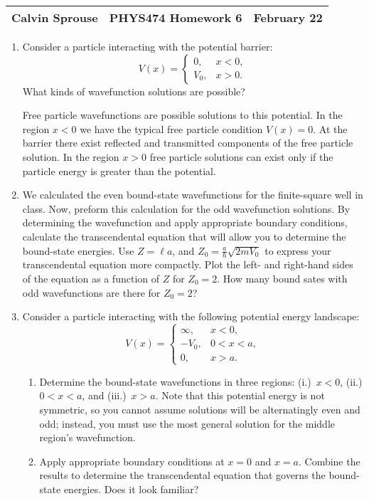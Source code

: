\documentclass[a4paper, 12pt]{config/homework}
\begin{document}
\noindent
\begin{tabularx}{\textwidth}{>{\centering\arraybackslash}X>{\centering\arraybackslash}X>{\centering\arraybackslash}X}
Calvin Sprouse & PHYS474 Homework 6 & 2024 February 22\\
\midrule
\end{tabularx}

\begin{enumerate}
\item Consider a particle interacting with the potential barrier:
\[V(x) = \begin{cases}
0, & x < 0, \\ V_0, & x > 0.
\end{cases}\]
What kinds of wavefunction solutions are possible?

Free particle wavefunctions are possible solutions to this potential.
In the region \(x<0\) we have the typical free particle condition \(V(x)=0\).
At the barrier there exist reflected and transmitted components of the free particle solution.
In the region \(x>0\) free particle solutions can exist only if the particle energy is greater than the potential.

\vspace{\baselineskip}
\item We calculated the even bound-state wavefunctions for the finite-square well in class. Now, preform this calculation for the odd wavefunction solutions. By determining the wavefunction and apply appropriate boundary conditions, calculate the transcendental equation that will allow you to determine the bound-state energies. Use \(Z = \ell a\), and \(Z_0 = \frac{a}{\hbar}\sqrt{2mV_0}\) to express your transcendental equation more compactly.
Plot the left- and right-hand sides of the equation as a function of \(Z\) for \(Z_0=2\). How many bound sates with odd wavefunctions are there for \(Z_0=2\)?



\pagebreak
\item Consider a particle interacting with the following potential energy landscape:
\[V(x) = \begin{cases}
\infty, & x < 0, \\ -V_0, & 0 < x < a, \\ 0, & x > a.
\end{cases}\]
\begin{enumerate}[label=(\alph*.)]
\item Determine the bound-state wavefunctions in three regions: (i.)~\(x < 0\), (ii.) \(0 < x < a\), and (iii.)~\(x > a\).
Note that this potential energy is not symmetric, so you cannot assume solutions will be alternatingly even and odd; instead, you must use the most general solution for the middle region's wavefunction.



\item Apply appropriate boundary conditions at \(x=0\) and \(x=a\). Combine the results to determine the transcendental equation that governs the bound-state energies. Does it look familiar?



\end{enumerate}
\end{enumerate}
\end{document}
